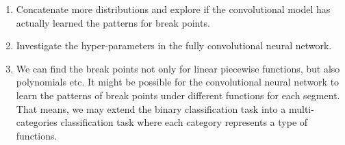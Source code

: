 \begin{enumerate}
	\item Concatenate more distributions and explore if the convolutional model has actually learned the patterns for break points.
	\item Investigate the hyper-parameters in the fully convolutional neural network.
	\item We can find the break points not only for linear piecewise functions, but also polynomials etc. It might be possible for the convolutional neural network to learn the patterns of break points under different functions for each segment. That means, we may extend the binary classification task into a multi-categories classification task where each category represents a type of functions.
\end{enumerate}





































